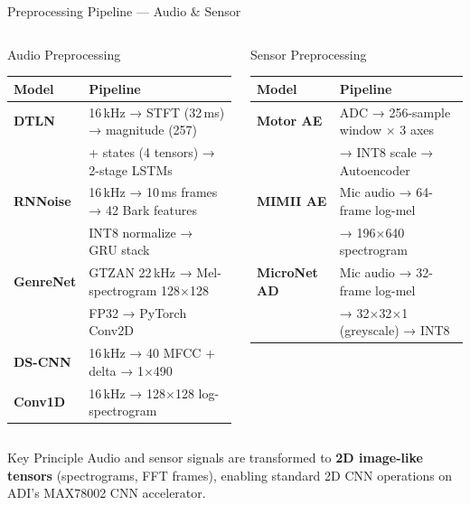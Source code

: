 \documentclass[aspectratio=169,10pt]{beamer}
\begin{document}
\begin{frame}{Preprocessing Pipeline — Audio \& Sensor}
  \begin{columns}[T]
    \begin{block}{Audio Preprocessing}
      \renewcommand{\arraystretch}{1.25}
      \begin{tabular}{@{}>{\bfseries\scriptsize}l >{\scriptsize}l@{}}
        \toprule
        Model & Pipeline \\
        \midrule
        DTLN & 16\,kHz → STFT (32\,ms) → magnitude (257) \\
             & + states (4 tensors) → 2-stage LSTMs \\[2pt]
        RNNoise & 16\,kHz → 10\,ms frames → 42 Bark features \\
                & INT8 normalize → GRU stack \\[2pt]
        GenreNet & GTZAN 22\,kHz → Mel-spectrogram 128$\times$128 \\
                 & FP32 → PyTorch Conv2D \\[2pt]
        DS-CNN & 16\,kHz → 40 MFCC + delta → 1$\times$490 \\[2pt]
        Conv1D & 16\,kHz → 128$\times$128 log-spectrogram \\
        \bottomrule
      \end{tabular}
    \end{block}

    \begin{block}{Sensor Preprocessing}
      \renewcommand{\arraystretch}{1.25}
      \begin{tabular}{@{}>{\bfseries\scriptsize}l >{\scriptsize}l@{}}
        \toprule
        Model & Pipeline \\
        \midrule
        Motor AE & ADC → 256-sample window × 3 axes \\
                 & → INT8 scale → Autoencoder \\[2pt]
        MIMII AE & Mic audio → 64-frame log-mel \\
                 & → 196$\times$640 spectrogram \\[2pt]
        MicroNet AD & Mic audio → 32-frame log-mel \\
                    & → 32$\times$32$\times$1 (greyscale) → INT8 \\
        \bottomrule
      \end{tabular}
    \end{block}
  \end{columns}

  \vspace{0.3cm}
  \begin{alertblock}{Key Principle}
    {\small Audio and sensor signals are transformed to \textbf{2D image-like tensors} (spectrograms, FFT frames), enabling standard 2D CNN operations on ADI's MAX78002 CNN accelerator.}
  \end{alertblock}
\end{frame}
\end{document}
